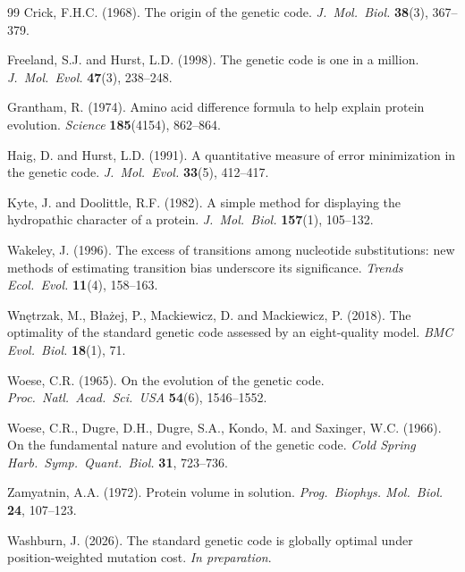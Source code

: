 \documentclass[11pt,twocolumn]{article}
\begin{document}
\begin{thebibliography}{99}
Crick, F.H.C. (1968). The origin of the genetic code.
\textit{J.~Mol.~Biol.} \textbf{38}(3), 367--379.

Freeland, S.J. and Hurst, L.D. (1998). The genetic code is one in a
million. \textit{J.~Mol.~Evol.} \textbf{47}(3), 238--248.

Grantham, R. (1974). Amino acid difference formula to help explain protein
evolution. \textit{Science} \textbf{185}(4154), 862--864.

Haig, D. and Hurst, L.D. (1991). A quantitative measure of error
minimization in the genetic code. \textit{J.~Mol.~Evol.} \textbf{33}(5),
412--417.

Kyte, J. and Doolittle, R.F. (1982). A simple method for displaying the
hydropathic character of a protein. \textit{J.~Mol.~Biol.} \textbf{157}(1),
105--132.

Wakeley, J. (1996). The excess of transitions among nucleotide
substitutions: new methods of estimating transition bias underscore its
significance. \textit{Trends Ecol.~Evol.} \textbf{11}(4), 158--163.

Wnętrzak, M., Błażej, P., Mackiewicz, D. and Mackiewicz, P. (2018).
The optimality of the standard genetic code assessed by an eight-quality
model. \textit{BMC Evol.~Biol.} \textbf{18}(1), 71.

Woese, C.R. (1965). On the evolution of the genetic code.
\textit{Proc.~Natl.~Acad.~Sci.~USA} \textbf{54}(6), 1546--1552.

Woese, C.R., Dugre, D.H., Dugre, S.A., Kondo, M. and Saxinger, W.C.
(1966). On the fundamental nature and evolution of the genetic code.
\textit{Cold Spring Harb.~Symp.~Quant.~Biol.} \textbf{31}, 723--736.

Zamyatnin, A.A. (1972). Protein volume in solution. \textit{Prog.~Biophys.
Mol.~Biol.} \textbf{24}, 107--123.

Washburn, J. (2026). The standard genetic code is globally optimal under
position-weighted mutation cost. \textit{In preparation}.
\end{thebibliography}
\end{document}

